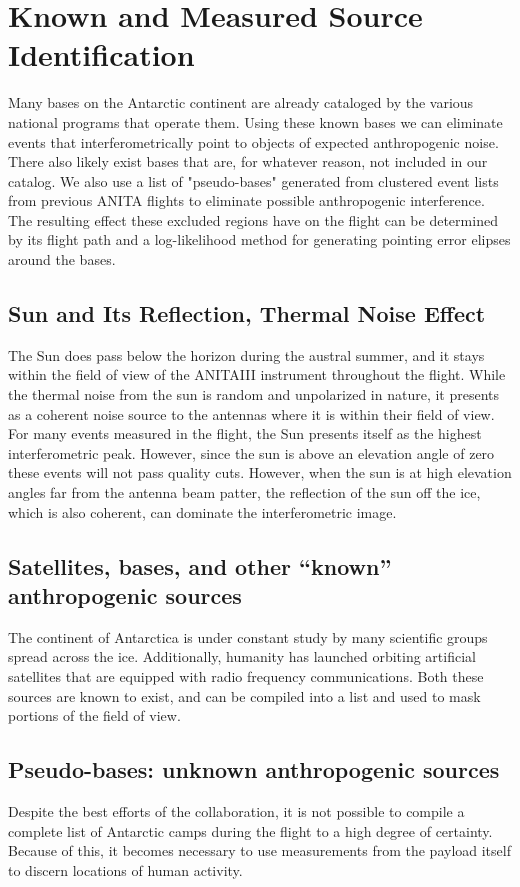 		
\section{Known and Measured Source Identification}%
	Many bases on the Antarctic continent are already cataloged by the various national programs that operate them.  Using these known bases we can eliminate events that interferometrically point to objects of expected anthropogenic noise.  There also likely exist bases that are, for whatever reason, not included in our catalog.  We also use a list of "pseudo-bases" generated from clustered event lists from previous ANITA flights to eliminate possible anthropogenic interference.  The resulting effect these excluded regions have on the flight can be determined by its flight path and a log-likelihood method for generating pointing error elipses around the bases.
	
	
	\subsection{Sun and Its Reflection, Thermal Noise Effect}
		The Sun does pass below the horizon during the austral summer, and it stays within the field of view of the ANITAIII instrument throughout the flight.  While the thermal noise from the sun is random and unpolarized in nature, it presents as a coherent noise source to the antennas where it is within their field of view.  For many events measured in the flight, the Sun presents itself as the highest interferometric peak.  However, since the sun is above an elevation angle of zero these events will not pass quality cuts. However, when the sun is at high elevation angles far from the antenna beam patter, the reflection of the sun off the ice, which is also coherent, can dominate the interferometric image.
	
	\subsection{Satellites, bases, and other ``known'' anthropogenic sources}
		The continent of Antarctica is under constant study by many scientific groups spread across the ice.  Additionally, humanity has launched orbiting artificial satellites that are equipped with radio frequency communications.  Both these sources are known to exist, and can be compiled into a list and used to mask portions of the field of view.  

	\subsection{Pseudo-bases: unknown anthropogenic sources}
		Despite the best efforts of the collaboration, it is not possible to compile a complete list of Antarctic camps during the flight to a high degree of certainty.  Because of this, it becomes necessary to use measurements from the payload itself to discern locations of human activity.  


